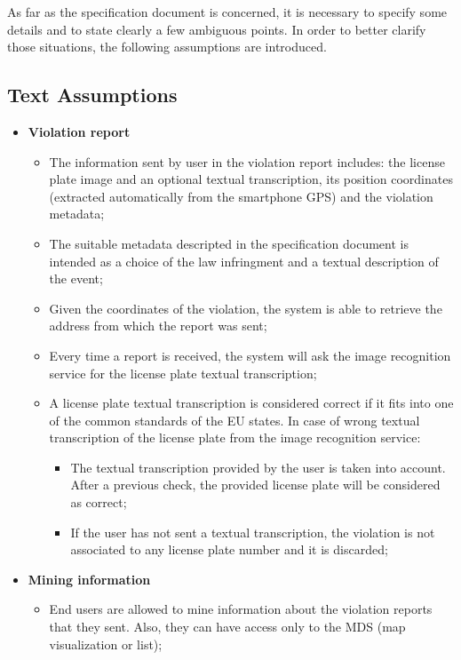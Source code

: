 As far as the specification document is concerned, it is necessary to specify some details and to state clearly a few ambiguous points. In order to better clarify those situations, the following assumptions are introduced.
\newpage\subsection{Text Assumptions}
\begin{itemize}
    \item \textbf{Violation report}
        \begin{itemize}
            \item The information sent by user in the violation report includes: the license plate image and an optional textual transcription, its position coordinates (extracted automatically from the smartphone GPS) and the violation metadata;
            \item The suitable metadata descripted in the specification document is intended as a choice of the law infringment and a textual description of the event;
            \item Given the coordinates of the violation, the system is able to retrieve the address from which the report was sent;
            \item Every time a report is received, the system will ask the image recognition service for the license plate textual transcription;
            \item A license plate textual transcription is considered correct if it fits into one of the common standards of the EU states. In case of wrong textual transcription of the license plate from the image recognition service:
            \begin{itemize}
                \item The textual transcription provided by the user is taken into account. After a previous check, the provided license plate will be considered as correct;
                \item If the user has not sent a textual transcription, the violation is not associated to any license plate number and it is discarded;
            \end{itemize} 
        \end{itemize}
    \item \textbf{Mining information} 
        \begin{itemize}
            \item End users are allowed to mine information about the violation reports that they sent. Also, they can have access only to the MDS (map visualization or list);

\end{itemize}
\end{itemize}
